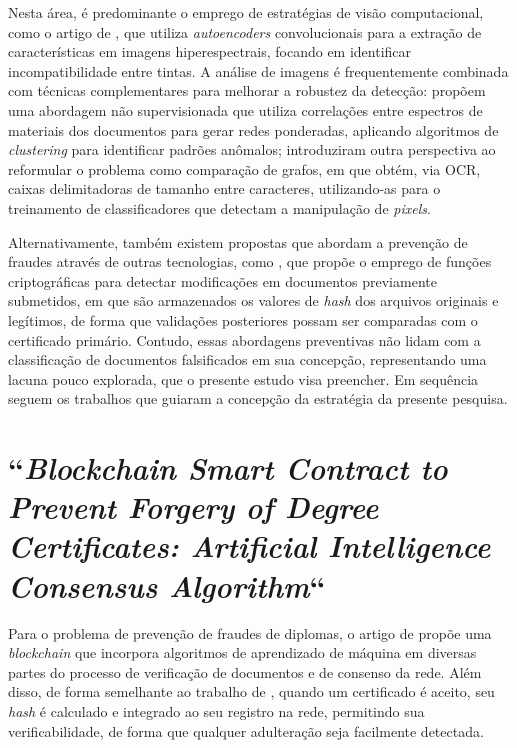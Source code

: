 Nesta área, é predominante o emprego de estratégias de visão computacional, como o artigo de \citeauthor*{inkcnn} \cite*{inkcnn}, que utiliza \textit{autoencoders} convolucionais para a extração de características em imagens hiperespectrais, focando em identificar incompatibilidade entre tintas. A análise de imagens é frequentemente combinada com técnicas complementares para melhorar a robustez da detecção: \citeauthor*{unsupervisednetwork} \cite*{unsupervisednetwork} propõem uma abordagem não supervisionada que utiliza correlações entre espectros de materiais dos documentos para gerar redes ponderadas, aplicando algoritmos de \textit{clustering} para identificar padrões anômalos; \citeauthor*{ocrgraph} \cite*{ocrgraph} introduziram outra perspectiva ao reformular o problema como comparação de grafos, em que obtém, via OCR, caixas delimitadoras de tamanho entre caracteres, utilizando-as para o treinamento de classificadores que detectam a manipulação de \textit{pixels}.

Alternativamente, também existem propostas que abordam a prevenção de fraudes através de outras tecnologias, como \citeauthor*{hashdetection} \cite*{hashdetection}, que propõe o emprego de funções criptográficas para detectar modificações em documentos previamente submetidos, em que são armazenados os valores de \textit{hash} dos arquivos originais e legítimos, de forma que validações posteriores possam ser comparadas com o certificado primário. Contudo, essas abordagens preventivas não lidam com a classificação de documentos falsificados em sua concepção, representando uma lacuna pouco explorada, que o presente estudo visa preencher. Em sequência seguem os trabalhos que guiaram a concepção da estratégia da presente pesquisa.

\section{``\protect\textit{Blockchain Smart Contract to Prevent Forgery of Degree Certificates: Artificial Intelligence Consensus Algorithm}``}

Para o problema de prevenção de fraudes de diplomas, o artigo de \citeauthor*{blockchainforgery} \cite*{blockchainforgery} propõe uma \textit{blockchain} que incorpora algoritmos de aprendizado de máquina em diversas partes do processo de verificação de documentos e de consenso da rede. Além disso, de forma semelhante ao trabalho de \citeauthor*{hashdetection} \cite*{hashdetection}, quando um certificado é aceito, seu \textit{hash} é calculado e integrado ao seu registro na rede, permitindo sua verificabilidade, de forma que qualquer adulteração seja facilmente detectada.

